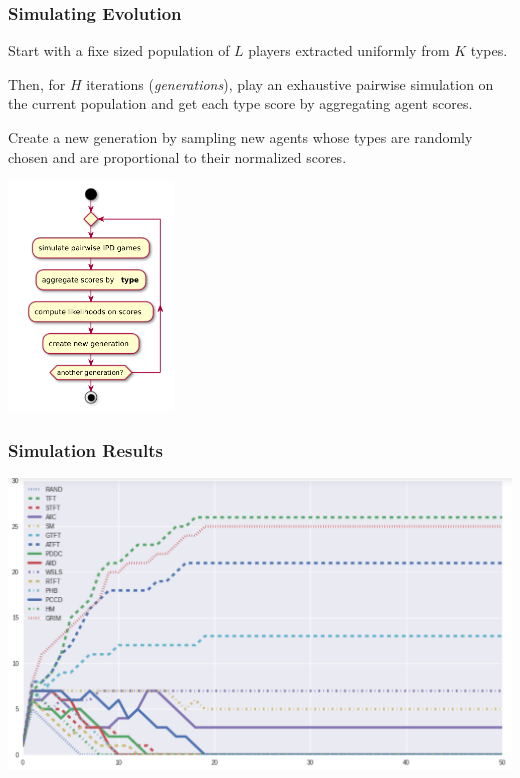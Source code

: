 \documentclass[xcolor={usenames,dvipsnames,svgnames}, compress]{beamer}
\begin{document}
\begin{frame}
  \frametitle{Simulating Evolution}
  Start with a fixe sized population of $L$ players extracted
  uniformly from $K$ types.

  Then, for $H$ iterations
  (\emph{generations}), play an exhaustive pairwise simulation on the
  current population and get each type score by aggregating agent
  scores.

  Create a new generation by sampling new agents whose types are randomly
  chosen and are proportional to their normalized scores.
  
  \begin{center}
    \includegraphics[width=0.33\textwidth]{../uml/activity-evol.png}
  \end{center} 
 
\end{frame}

\begin{frame}
  \frametitle{Simulation Results}
  \begin{center}
    \includegraphics[width=1.0\textwidth]{figures/sim_evol.png}
  \end{center}
\end{frame}
\end{document}

